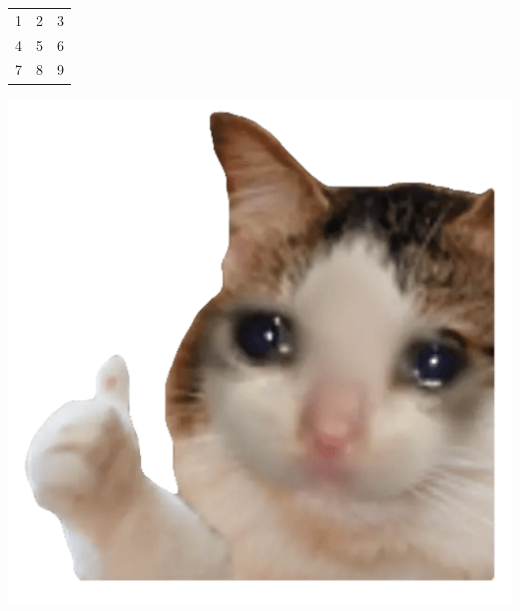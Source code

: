 \documentclass{article}
\begin{document}
\begin{center}
    \begin{tabular} { c c c }
        1 & 2 & 3 \\
4 & 5 & 6 \\
7 & 8 & 9    
    \end{tabular}
\end{center}
\includegraphics{ sadcat }
\end{document}
